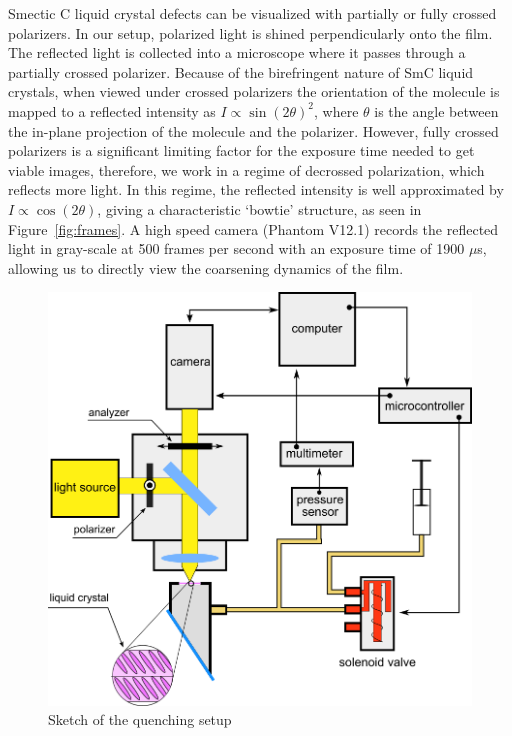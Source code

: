 \documentclass[prl,reprint,showpacs,floatfix,nofootinbib]{revtex4-1}
\begin{document}

Smectic C liquid crystal defects can be visualized with partially or fully crossed polarizers. In our setup, polarized light is shined perpendicularly onto the film. The reflected light is collected into a microscope where it passes through a partially crossed polarizer. Because of the birefringent nature of SmC liquid crystals, when viewed under crossed polarizers the orientation of the molecule is mapped to a reflected intensity as $I \propto \sin(2\theta)^2$, where $\theta$ is the angle between the in-plane projection of the molecule and the polarizer. However, fully crossed polarizers is a significant limiting factor for the exposure time needed to get viable images, therefore, we work in a regime of decrossed polarization, which reflects more light. In this regime, the reflected intensity is well approximated by $I \propto \cos(2\theta)$, giving a characteristic `bowtie' structure, as seen in Figure~\ref{fig:frames}\cite{chattham_triclinic_2010}. A high speed camera (Phantom V12.1) records the reflected light in gray-scale at 500 frames per second with an exposure time of 1900 $\mu$s, allowing us to directly view the coarsening dynamics of the film.

\begin{figure}
  \includegraphics[width=\linewidth]{quench-schematic.png}
  \caption{Sketch of the quenching setup}
  \label{fig:Setup Sketch}
\end{figure}
\end{document}
